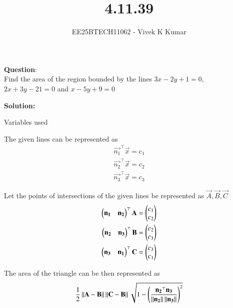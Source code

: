 \documentclass[journal]{IEEEtran}
\title{4.11.39}
\author{EE25BTECH11062 - Vivek K Kumar}
\begin{document}
\maketitle

\renewcommand{\thefigure}{\theenumi}
\renewcommand{\thetable}{\theenumi}


\textbf{Question}:\\
Find the area of the region bounded by the lines $3x - 2y + 1 = 0$, $2x + 3y - 21 = 0$
and $x - 5y + 9 = 0$

\textbf{Solution: }

\begin{table}[H]    
  \centering
  
  \caption{Variables used}
  \label{tab:4.11.39}
\end{table}

The given lines can be represented as 
\begin{align}
    \vec{n_1}^\top\vec{x} = c_1\\
    \vec{n_2}^\top\vec{x} = c_2\\
    \vec{n_3}^\top\vec{x} = c_3
\end{align}

Let the points of intersections of the given lines be represented as $\vec{A}, \vec{B}, \vec{C}$
\begin{align}
    \begin{pmatrix}\mathbf{n_1} & \mathbf{n_2}\end{pmatrix}^\top\mathbf{A} = \begin{pmatrix}c_1 \\ c_2\end{pmatrix}\\
    \begin{pmatrix}\mathbf{n_2} & \mathbf{n_3}\end{pmatrix}^\top\mathbf{B} = \begin{pmatrix}c_2 \\ c_3\end{pmatrix} \\
    \begin{pmatrix}\mathbf{n_3} & \mathbf{n_1}\end{pmatrix}^\top\mathbf{C} = \begin{pmatrix}c_3 \\ c_1\end{pmatrix} 
\end{align}

The area of the triangle can be then represented as
\begin{align}
    \frac{1}{2} \left\lVert\mathbf{A}-\mathbf{B}\right\rVert\left\lVert\mathbf{C}-\mathbf{B}\right\rVert \sqrt{1- \left(\frac{\mathbf{n_2}^\top\mathbf{n_3}}{\left\lVert\mathbf{n_2}\right\rVert\left\lVert\mathbf{n_3}\right\rVert}\right) ^ 2}
\end{align}
\end{document}
